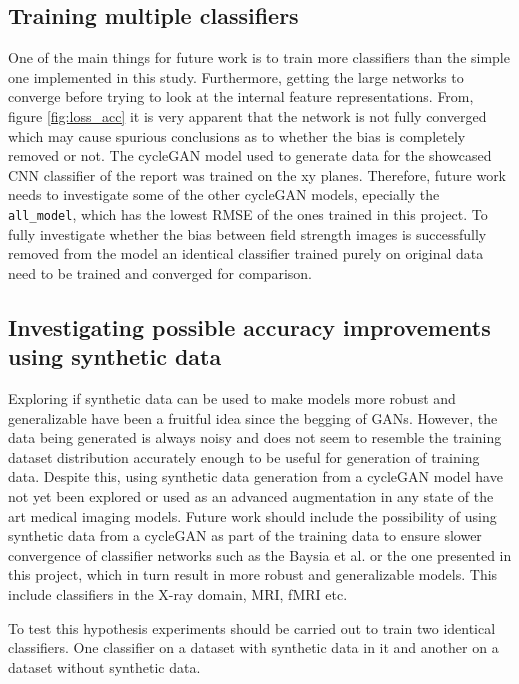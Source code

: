\documentclass[12pt, fleqn, titlepage]{article}
\newcommand{\1}[1]{\mathds{1}\left[#1\right]}
\begin{document}
\subsection{Training multiple classifiers}\label{future_work_mult}


One of the main things for future work is to train more classifiers than the simple one implemented in this study. Furthermore, getting the large networks to converge before trying to look at the internal feature representations. From, figure \ref{fig:loss_acc} it is very apparent that the network is not fully converged which may cause spurious conclusions as to whether the bias is completely removed or not. The cycleGAN model used to generate data for the showcased CNN classifier of the report was trained on the xy planes. Therefore, future work needs to investigate some of the other cycleGAN models, epecially the \texttt{all\_model}, which has the lowest RMSE of the ones trained in this project. To fully investigate whether the bias between field strength images is successfully removed from the model an identical classifier trained purely on original data need to be trained and converged for comparison.

\subsection{Investigating possible accuracy improvements using synthetic data}

Exploring if synthetic data can be used to make models more robust and generalizable have been a fruitful idea since the begging of GANs. However, the data being generated is always  noisy and does not seem to resemble the training dataset distribution accurately enough to be useful for generation of training data. Despite this, using synthetic data generation from a cycleGAN model have not yet been explored or used as an advanced augmentation in any state of the art medical imaging models. Future work should include the possibility of using synthetic data from a cycleGAN as part of the training data to ensure slower convergence of classifier networks such as the Baysia et al. or the one presented in this project, which in turn result in more robust and generalizable models. This include classifiers in the X-ray domain, MRI, fMRI etc.

To test this hypothesis experiments should be carried out to train two identical classifiers. One classifier on a dataset with synthetic data in it and another on a dataset without synthetic data. 
\end{document}
